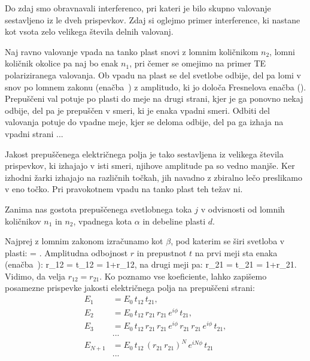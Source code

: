 Do zdaj smo obravnavali interferenco, pri kateri je bilo skupno valovanje sestavljeno iz le 
dveh prispevkov. Zdaj si oglejmo primer interference, ki nastane kot vsota zelo velikega 
števila delnih valovanj. 

Naj ravno valovanje vpada na tanko plast snovi z lomnim količnikom $n_2$, lomni količnik 
okolice pa naj bo enak $n_1$, pri čemer se omejimo na primer TE polariziranega valovanja.
Ob vpadu na plast se del svetlobe odbije, del pa lomi v snov po lomnem zakonu (enačba~) 
z amplitudo, ki jo določa Fresnelova enačba (). Prepuščeni val potuje po plasti do meje
na drugi strani, kjer je ga ponovno nekaj odbije, del pa je prepuščen v smeri, ki 
je enaka vpadni smeri. Odbiti del valovanja potuje 
do vpadne meje, kjer se deloma odbije, del pa ga izhaja na vpadni strani ... 

Jakost prepuščenega električnega polja je tako sestavljena iz velikega števila prispevkov, ki 
izhajajo v isti smeri, njihove amplitude pa so vedno manjše. Ker izhodni žarki 
izhajajo na različnih točkah, jih navadno z zbiralno lečo preslikamo v eno točko. Pri pravokotnem
vpadu na tanko plast teh težav ni. 

Zanima nas gostota prepuščenega svetlobnega toka $j$ v odvisnosti od 
lomnih količnikov $n_1$ in $n_2$, vpadnega kota $\alpha$ in debeline plasti $d$. 

Najprej z lomnim zakonom izračunamo kot $\beta$, pod katerim se širi svetloba v plasti:
\beq
\sin\beta = \sin\alpha.
\label{eq:06_25}
\eeq
Amplitudna odbojnost $r$ in prepustnot $t$ na prvi meji sta enaka (enačba~):
\beq
r_{12} = \qquad 
{}\qquad t_{12} = 1+r_{12},
\label{eq:06_26}
\eeq
na drugi meji pa:
\beq
r_{21} = \qquad 
{}\qquad t_{21} = 1+r_{21}.
\label{eq:06_27}
\eeq
Vidimo, da velja $r_{12} = r_{21}$. Ko poznamo vse koeficiente, lahko zapišemo
posamezne prispevke jakosti električnega polja na prepuščeni strani:
\begin{align}
E_1 &= E_0\,t_{12}\,t_{21},\\
E_2 &= E_0\,t_{12}\,r_{21}\,r_{21}\,e^{i\phi}\,t_{21},\\
E_3 &= E_0\,t_{12}\,r_{21}\,r_{21}\,e^{i\phi}\,r_{21}\,r_{21}\,e^{i\phi}\,t_{21},\\
&...\\
E_{N+1} &= E_0\,t_{12}\,\left(r_{21}\,r_{21}\right)^N\,e^{iN\phi}\,t_{21}\\
&...
\label{eq:06_29}
\end{align}

